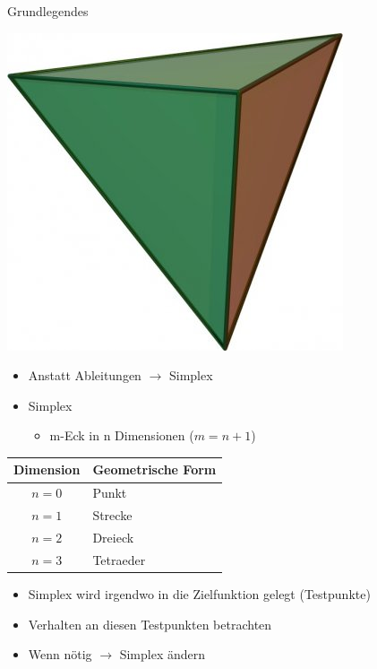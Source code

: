 \documentclass[\outputformat]{beamer}
\begin{document}
\begin{frame}{Grundlegendes}
	\begin{minipage}[m]{4cm}
		\includegraphics[height=0.3\paperheight]{../bilder/tetraeder.jpg}
	\end{minipage}
	\begin{minipage}[m]{7cm}
		\begin{itemize}
			\item Anstatt Ableitungen $\rightarrow$ Simplex
			\item Simplex
				\begin{itemize}
					\item m-Eck in n Dimensionen ($m=n+1$)\\
				\end{itemize}
		\end{itemize}
		\begin{tabular}{c|l}
		Dimension & Geometrische Form\\
		\hline
		$n=0$ & Punkt\\
		$n=1$ & Strecke\\
		$n=2$ & Dreieck\\
		$n=3$ & Tetraeder
		\end{tabular} 
		\begin{itemize}
			\pause\item Simplex wird irgendwo in die Zielfunktion gelegt (Testpunkte)
			\pause\item Verhalten an diesen Testpunkten betrachten
			\pause\item Wenn nötig $\rightarrow$ Simplex ändern
		\end{itemize}
	\end{minipage}
\end{frame}
\end{document}
